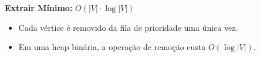 \documentclass[preview]{standalone}
\begin{document}
\begin{center}
\textbf{Extrair Mínimo:} $O(|V| \cdot \log |V|)$
            \begin{itemize}
                \item Cada vértice é removido da fila de prioridade uma única vez.
                \item Em uma heap binária, a operação de remoção custa $O(\log |V|)$.
            \end{itemize}
\end{center}
\end{document}
